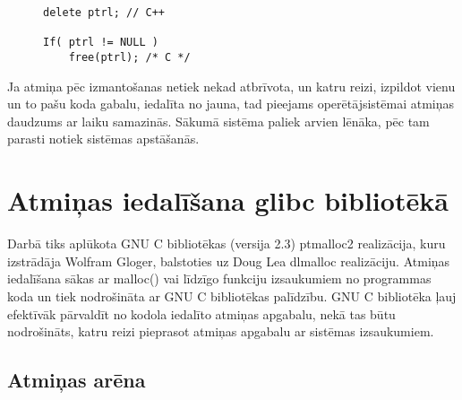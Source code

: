 \begin{figure}[h]
\begin{lstlisting}
delete ptrl; // C++

If( ptrl != NULL )
	free(ptrl); /* C */
\end{lstlisting}
\caption{\textbf{\fontsize{11}{12}\selectfont {Dinamiskās atmiņas atbrīvošana C un C++}}}
\end{figure}


Ja atmiņa pēc izmantošanas netiek nekad atbrīvota, un katru reizi, izpildot vienu un to pašu koda gabalu, iedalīta no jauna, tad pieejams operētājsistēmai atmiņas daudzums ar laiku samazinās.
Sākumā sistēma paliek arvien lēnāka, pēc tam parasti notiek sistēmas apstāšanās.






\section{Atmiņas iedalīšana glibc bibliotēkā}
Darbā tiks aplūkota GNU C bibliotēkas (versija 2.3) ptmalloc2 realizācija, kuru izstrādāja Wolfram Gloger, balstoties uz Doug Lea dlmalloc realizāciju. 
Atmiņas iedalīšana sākas ar malloc() vai līdzīgo funkciju izsaukumiem no programmas koda un tiek nodrošināta ar GNU C bibliotēkas palīdzību. 
GNU C bibliotēka ļauj efektīvāk pārvaldīt no kodola iedalīto atmiņas apgabalu, nekā tas būtu nodrošināts, katru reizi pieprasot atmiņas apgabalu ar sistēmas izsaukumiem.



\subsection{Atmiņas arēna}

